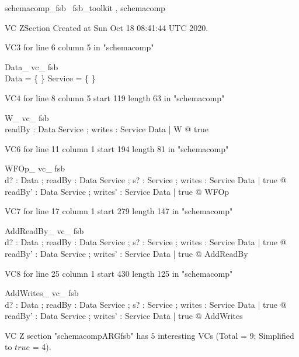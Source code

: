 \documentclass{article}
\begin{document}

\begin{zsection}	 \SECTION schemacomp\_fsb \parents~fsb\_toolkit , schemacomp
\end{zsection}

VC ZSection Created at Sun Oct 18 08:41:44 UTC 2020.

VC3 for line 6 column 5 in "schemacomp"
\begin{theorem}{ Data\_ vc\_ fsb}\\
 \lnot Data = \{ \} \land \lnot Service = \{ \} \\

\end{theorem}

VC4 for line 8 column 5 start 119 length 63 in "schemacomp"
\begin{theorem}{ W\_ vc\_ fsb}\\
 \exists readBy : Data \rel Service ; writes : Service \rel Data | W @ true \\

\end{theorem}

VC6 for line 11 column 1 start 194 length 81 in "schemacomp"
\begin{theorem}{ WFOp\_ vc\_ fsb}\\
 \forall d? : Data ; readBy : Data \rel Service ; s? : Service ; writes : Service \rel Data | true @ \exists readBy' : Data \rel Service ; writes' : Service \rel Data | true @ WFOp \\

\end{theorem}

VC7 for line 17 column 1 start 279 length 147 in "schemacomp"
\begin{theorem}{ AddReadBy\_ vc\_ fsb}\\
 \forall d? : Data ; readBy : Data \rel Service ; s? : Service ; writes : Service \rel Data | true @ \exists readBy' : Data \rel Service ; writes' : Service \rel Data | true @ AddReadBy \\

\end{theorem}

VC8 for line 25 column 1 start 430 length 125 in "schemacomp"
\begin{theorem}{ AddWrites\_ vc\_ fsb}\\
 \forall d? : Data ; readBy : Data \rel Service ; s? : Service ; writes : Service \rel Data | true @ \exists readBy' : Data \rel Service ; writes' : Service \rel Data | true @ AddWrites \\

\end{theorem}



 VC Z section "schemacompARGfsb" has $5$ interesting VCs (Total = 9; Simplified to $true$ = 4).



\end{document}
